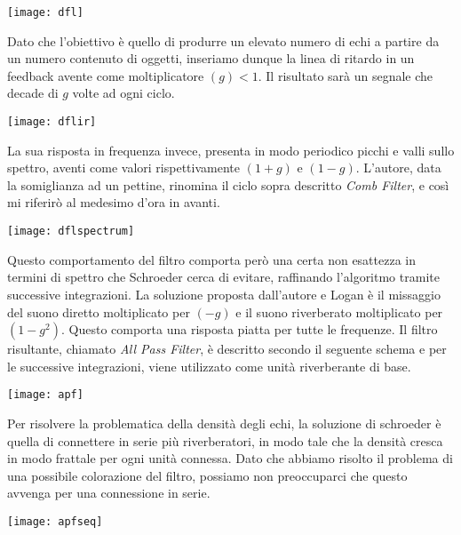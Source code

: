 \begin{center}
\texttt{[image: dfl]}
\end{center}

Dato che l'obiettivo è quello di produrre un elevato numero di echi a partire da un numero contenuto di oggetti, inseriamo dunque la linea di ritardo in un feedback avente come moltiplicatore $(g) < 1$. 
Il risultato sarà un segnale che decade di $g$ volte ad ogni ciclo. 

\begin{center}
\texttt{[image: dflir]}
\end{center}

La sua risposta in frequenza invece, presenta in modo periodico picchi e valli sullo spettro, aventi come valori rispettivamente $(1+g)$ e $(1-g)$. L’autore, data la somiglianza ad un pettine, rinomina il ciclo sopra descritto \emph{Comb Filter}, e così mi riferirò al medesimo d’ora in avanti.

\begin{center}
\texttt{[image: dflspectrum]}
\end{center}

Questo comportamento del filtro comporta però una certa non esattezza in termini di spettro che Schroeder cerca di evitare, raffinando l’algoritmo tramite successive integrazioni.
La soluzione proposta dall’autore e Logan è il missaggio del suono diretto moltiplicato per $(-g)$ e il suono riverberato moltiplicato per $(1-g^2)$. Questo comporta una risposta piatta per tutte le frequenze. Il filtro risultante, chiamato \emph{All Pass Filter}, è descritto secondo il seguente schema e per le successive integrazioni, viene utilizzato come unità riverberante di base.

\begin{center}
\texttt{[image: apf]}
\end{center}

Per risolvere la problematica della densità degli echi, la soluzione di schroeder è quella di connettere in serie più riverberatori, in modo tale che la densità cresca in modo frattale per ogni unità connessa. Dato che abbiamo risolto il problema di una possibile colorazione del filtro, possiamo non preoccuparci che questo avvenga per una connessione in serie.

\begin{center}
\texttt{[image: apfseq]}
\end{center}

